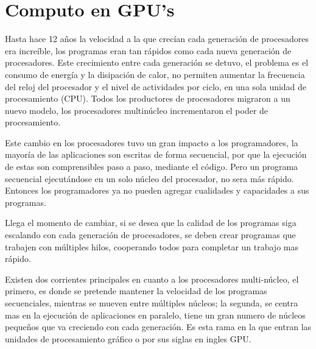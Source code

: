 \chapter{Computo en GPU's}
Hasta hace 12 años la velocidad a la que crecían cada generación de procesadores era increíble, los programas eran tan rápidos como cada nueva generación de procesadores. Este crecimiento entre cada generación se detuvo, el problema es el consumo de energía y la disipación de calor, no permiten aumentar la frecuencia del reloj del procesador y el nivel de actividades por ciclo, en una sola unidad de procesamiento (CPU). Todos los productores de procesadores migraron a un nuevo modelo, los procesadores multinúcleo incrementaron el poder de procesamiento.

Este cambio en los procesadores tuvo un gran impacto a los programadores, la mayoría de las aplicaciones son escritas de forma secuencial,  por que la ejecución de estas son comprensibles paso a paso, mediante el código. Pero un programa secuencial ejecutándose en un solo núcleo del procesador, no sera más rápido. Entonces los programadores ya no pueden agregar cualidades y capacidades a sus programas.






Llega el momento de cambiar, si se desea que la calidad de los programas siga escalando con cada generación de procesadores, se deben crear programas que trabajen con múltiples hilos, cooperando todos para completar un trabajo mas rápido. 

\pagebreak



Existen dos corrientes principales en cuanto a los procesadores multi-núcleo, el primero, es donde se pretende mantener la velocidad de los programas secuenciales, mientras se mueven entre múltiples núcleos; la segunda, se centra mas en la ejecución de aplicaciones en paralelo, tiene un gran numero de núcleos pequeños que va creciendo con cada generación. Es esta rama en la que entran las unidades de procesamiento gráfico o por sus siglas en ingles GPU.\cite{Kirk2010} \\\\\\ 

